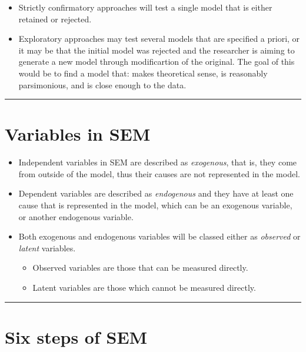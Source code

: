 \documentclass[
  a4paper,
  DIV=11,
  numbers=noendperiod]{scrreprt}
\providecommand{\tightlist}{%
  \setlength{\itemsep}{0pt}\setlength{\parskip}{0pt}}\usepackage{longtable,booktabs,array}
\begin{document}
\begin{itemize}
  \begin{itemize}
  \tightlist
  \item
    Strictly confirmatory approaches will test a single model that is
    either retained or rejected.
  \item
    Exploratory approaches may test several models that are specified a
    priori, or it may be that the initial model was rejected and the
    researcher is aiming to generate a new model through modificartion
    of the original. The goal of this would be to find a model that:
    makes theoretical sense, is reasonably parsimonious, and is close
    enough to the data.
  \end{itemize}
\end{itemize}

\begin{center}\rule{0.5\linewidth}{0.5pt}\end{center}

\section{Variables in SEM}\label{variables-in-sem}

\begin{itemize}
\tightlist
\item
  Independent variables in SEM are described as \emph{exogenous}, that
  is, they come from outside of the model, thus their causes are not
  represented in the model.
\item
  Dependent variables are described as \emph{endogenous} and they have
  at least one cause that is represented in the model, which can be an
  exogenous variable, or another endogenous variable.
\item
  Both exogenous and endogenous variables will be classed either as
  \emph{observed} or \emph{latent} variables.

  \begin{itemize}
  \tightlist
  \item
    Observed variables are those that can be measured directly.
  \item
    Latent variables are those which cannot be measured directly.
  \end{itemize}
\end{itemize}

\begin{center}\rule{0.5\linewidth}{0.5pt}\end{center}

\section{Six steps of SEM}\label{six-steps-of-sem}
\end{document}
